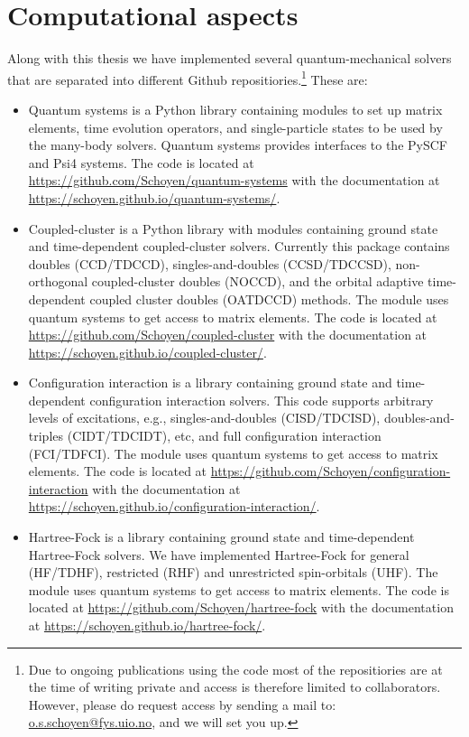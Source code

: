 \chapter{Computational aspects}
    Along with this thesis we have implemented several quantum-mechanical
    solvers that are separated into different Github repositiories.\footnote{%
        Due to ongoing publications using the code most of the repositiories are
        at the time of writing private and access is therefore limited to
        collaborators.
        However, please do request access by sending a mail to:
        \href{mailto:o.s.schoyen@fys.uio.no}{o.s.schoyen@fys.uio.no}, and we will
        set you up.
    }
    These are:
    \begin{itemize}
        \item Quantum systems is a Python library containing modules to set up
            matrix elements, time evolution operators, and single-particle
            states to be used by the many-body solvers.
            Quantum systems provides interfaces to the PySCF \cite{pyscf} and
            Psi4 \cite{psi4} systems.
            The code is located at
            \url{https://github.com/Schoyen/quantum-systems} with the
            documentation at
            \url{https://schoyen.github.io/quantum-systems/}.
        \item Coupled-cluster is a Python library with modules containing ground
            state and time-dependent coupled-cluster solvers.
            Currently this package contains doubles (CCD/TDCCD),
            singles-and-doubles (CCSD/TDCCSD), non-orthogonal coupled-cluster
            doubles (NOCCD), and the orbital adaptive time-dependent coupled
            cluster doubles (OATDCCD) methods.
            The module uses quantum systems to get access to matrix elements.
            The code is located at
            \url{https://github.com/Schoyen/coupled-cluster} with the
            documentation at
            \url{https://schoyen.github.io/coupled-cluster/}.
        \item Configuration interaction is a library containing ground state and
            time-dependent configuration interaction solvers.
            This code supports arbitrary levels of excitations, e.g.,
            singles-and-doubles (CISD/TDCISD), doubles-and-triples
            (CIDT/TDCIDT), etc, and full configuration interaction (FCI/TDFCI).
            The module uses quantum systems to get access to matrix elements.
            The code is located at
            \url{https://github.com/Schoyen/configuration-interaction} with
            the documentation at
            \url{https://schoyen.github.io/configuration-interaction/}.
        \item Hartree-Fock is a library containing ground state and
            time-dependent Hartree-Fock solvers.
            We have implemented Hartree-Fock for general (HF/TDHF), restricted
            (RHF) and unrestricted spin-orbitals (UHF).
            The module uses quantum systems to get access to matrix elements.
            The code is located at
            \url{https://github.com/Schoyen/hartree-fock} with
            the documentation at
            \url{https://schoyen.github.io/hartree-fock/}.
    \end{itemize}
